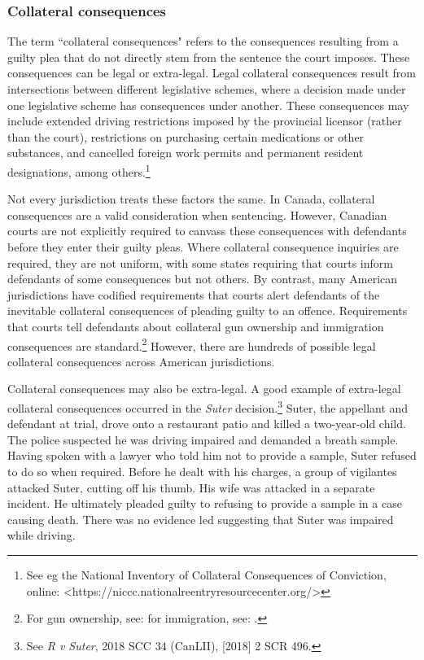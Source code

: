 \subsubsection{Collateral consequences}

The term ``collateral consequences" refers to the consequences resulting from a guilty plea that do not directly stem from the sentence the court imposes. These consequences can be legal or extra-legal. Legal collateral consequences result from intersections between different legislative schemes, where a decision made under one legislative scheme has consequences under another. These consequences may include extended driving restrictions imposed by the provincial licensor (rather than the court), restrictions on purchasing certain medications or other substances, and cancelled foreign work permits and permanent resident designations, among others.\footnote{See eg the National Inventory of Collateral Consequences of Conviction, online: \textless https://niccc.nationalreentryresourcecenter.org/\textgreater}

Not every jurisdiction treats these factors the same. In Canada, collateral consequences are a valid consideration when sentencing. However, Canadian courts are not explicitly required to canvass these consequences with defendants before they enter their guilty pleas. Where collateral consequence inquiries are required, they are not uniform, with some states requiring that courts inform defendants of some consequences but not others. By contrast, many American jurisdictions have codified requirements that courts alert defendants of the inevitable collateral consequences of pleading guilty to an offence. Requirements that courts tell defendants about collateral gun ownership and immigration consequences are standard.\footnote{For gun ownership, see: for immigration, see: .} However, there are hundreds of possible legal collateral consequences across American jurisdictions.

Collateral consequences may also be extra-legal. A good example of extra-legal collateral consequences occurred in the \textit{Suter} decision.\footnote{See \textit{R v Suter}, 2018 SCC 34 (CanLII), [2018] 2 SCR 496.} Suter, the appellant and defendant at trial, drove onto a restaurant patio and killed a two-year-old child. The police suspected he was driving impaired and demanded a breath sample. Having spoken with a lawyer who told him not to provide a sample, Suter refused to do so when required. Before he dealt with his charges, a group of vigilantes attacked Suter, cutting off his thumb. His wife was attacked in a separate incident. He ultimately pleaded guilty to refusing to provide a sample in a case causing death. There was no evidence led suggesting that Suter was impaired while driving.

